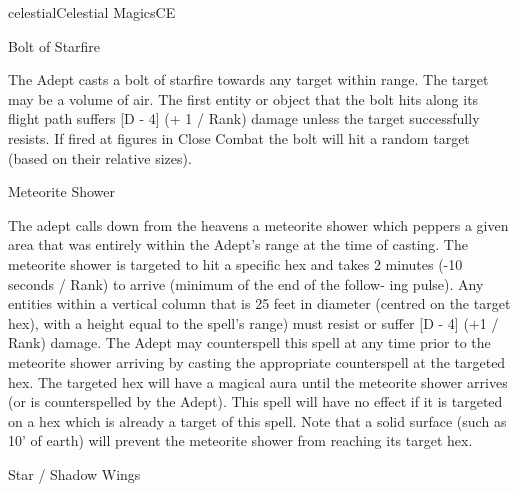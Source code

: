 \begin{College}[1.3]{celestial}{Celestial Magics}{CE}
\begin{spell}[S-3]{Bolt of Starfire}

\begin{effects}
The Adept casts a bolt of starfire towards any target within range.
The target may be a volume of air.  The first entity or object that
the bolt hits along its flight path suffers [D - 4] (+ 1 / Rank)
damage unless the target successfully resists.  If fired at figures in
Close Combat the bolt will hit a random target (based on their
relative sizes).
\end{effects}
\end{spell}

\begin{spell}[S-4]{Meteorite Shower}

\begin{effects}
The adept calls down from the heavens a meteorite shower which peppers
a given area that was entirely within the Adept’s range at the time of
casting.  The meteorite shower is targeted to hit a specific hex and
takes 2 minutes (-10 seconds / Rank) to arrive (minimum of the end of
the follow- ing pulse).  Any entities within a vertical column that is
25 feet in diameter (centred on the target hex), with a height equal
to the spell’s range) must resist or suffer [D - 4] (+1 / Rank)
damage.  The Adept may counterspell this spell at any time prior to
the meteorite shower arriving by casting the appropriate counterspell
at the targeted hex.  The targeted hex will have a magical aura until
the meteorite shower arrives (or is counterspelled by the Adept).
This spell will have no effect if it is targeted on a hex which is
already a target of this spell.  Note that a solid surface (such as
10’ of earth) will prevent the meteorite shower from reaching its
target hex.
\end{effects}
\end{spell}

\begin{spell}[S-5]{Star / Shadow Wings}


\end{spell}
\end{College}
